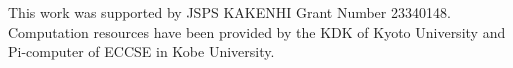 \documentclass[draft,jgrga]{agutex2015}
\begin{document}
\begin{article}
\begin{acknowledgments}
This work was supported by JSPS KAKENHI Grant Number 23340148. 
Computation resources have been provided by the KDK of Kyoto University
and Pi-computer of ECCSE in Kobe University.
\end{acknowledgments}

%
%
%
%
%
%
%
%
%




%
%
%
%


\end{article}
\end{document}

